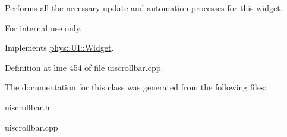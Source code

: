 Performs all the necessary update and automation processes for this widget. 

\begin{DoxyInternal}{For internal use only.}
\end{DoxyInternal}


Implements \hyperlink{classphys_1_1UI_1_1Widget_a1806425fcd684c2f0d50cd0ef4a6b0da}{phys::UI::Widget}.



Definition at line 454 of file uiscrollbar.cpp.



The documentation for this class was generated from the following files:\begin{DoxyCompactItemize}
\item 
uiscrollbar.h\item 
uiscrollbar.cpp\end{DoxyCompactItemize}
